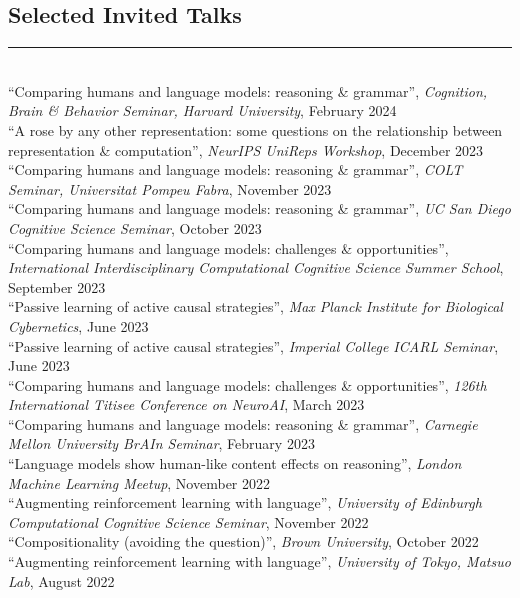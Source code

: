\documentclass[margin]{res}
\begin{document}
\begin{resume}
\vspace{1pt}\section{Selected Invited Talks} \vspace{-15pt} \rule{\textwidth}{0.5pt} \\[3pt]
{``Comparing humans and language models: reasoning \& grammar'',} \textit{Cognition, Brain \& Behavior Seminar, Harvard University}, February 2024\\[3pt] 
{``A rose by any other representation: some questions on the relationship between representation \& computation'',} \textit{NeurIPS UniReps Workshop}, December 2023\\[3pt] 
{``Comparing humans and language models: reasoning \& grammar'',} \textit{COLT Seminar, Universitat Pompeu Fabra}, November 2023\\[3pt] 
{``Comparing humans and language models: reasoning \& grammar'',} \textit{UC San Diego Cognitive Science Seminar}, October 2023\\[3pt] 
{``Comparing humans and language models: challenges \& opportunities'',} \textit{International Interdisciplinary Computational Cognitive Science Summer School}, September 2023\\[3pt] 
{``Passive learning of active causal strategies'',} \textit{Max Planck Institute for Biological Cybernetics}, June 2023\\[3pt]
{``Passive learning of active causal strategies'',} \textit{Imperial College ICARL Seminar}, June 2023\\[3pt]
{``Comparing humans and language models: challenges \& opportunities'',} \textit{126th International Titisee Conference on NeuroAI}, March 2023\\[3pt] 
{``Comparing humans and language models: reasoning \& grammar'',} \textit{Carnegie Mellon University BrAIn Seminar}, February 2023\\[3pt] 
{``Language models show human-like content effects on reasoning'',} \textit{London Machine Learning Meetup}, November 2022\\[3pt] 
{``Augmenting reinforcement learning with language'',} \textit{University of Edinburgh Computational Cognitive Science Seminar}, November 2022\\[3pt] 
{``Compositionality (avoiding the question)'',} \textit{Brown University}, October 2022\\[3pt] 
{``Augmenting reinforcement learning with language'',} \textit{University of Tokyo, Matsuo Lab}, August 2022\\[3pt] 

\end{resume}
\end{document}
